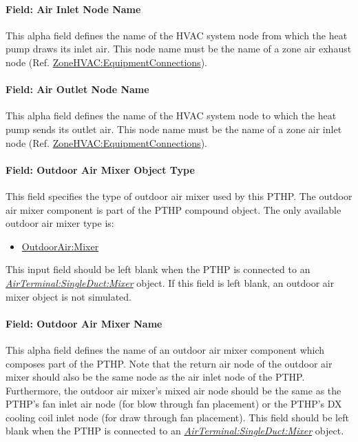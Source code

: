 \paragraph{Field: Air Inlet Node Name}\label{field-air-inlet-node-name-6-000}

This alpha field defines the name of the HVAC system node from which the heat pump draws its inlet air. This node name must be the name of a zone air exhaust node (Ref. \hyperref[zonehvacequipmentconnections]{ZoneHVAC:EquipmentConnections}).

\paragraph{Field: Air Outlet Node Name}\label{field-air-outlet-node-name-6-001}

This alpha field defines the name of the HVAC system node to which the heat pump sends its outlet air. This node name must be the name of a zone air inlet node (Ref. \hyperref[zonehvacequipmentconnections]{ZoneHVAC:EquipmentConnections}).

\paragraph{Field: Outdoor Air Mixer Object Type}\label{field-outdoor-air-mixer-object-type-3}

This field specifies the type of outdoor air mixer used by this PTHP. The outdoor air mixer component is part of the PTHP compound object. The only available outdoor air mixer type is:

\begin{itemize}
\tightlist
\item
  \hyperref[outdoorairmixer]{OutdoorAir:Mixer}
\end{itemize}

This input field should be left blank when the PTHP is connected to an \textit{\hyperref[airterminalsingleductmixer]{AirTerminal:SingleDuct:Mixer}} object. If this field is left blank, an outdoor air mixer object is not simulated.

\paragraph{Field: Outdoor Air Mixer Name}\label{field-outdoor-air-mixer-name-3}

This alpha field defines the name of an outdoor air mixer component which composes part of the PTHP. Note that the return air node of the outdoor air mixer should also be the same node as the air inlet node of the PTHP. Furthermore, the outdoor air mixer's mixed air node should be the same as the PTHP's fan inlet air node (for blow through fan placement) or the PTHP's DX cooling coil inlet node (for draw through fan placement). This field should be left blank when the PTHP is connected to an \textit{\hyperref[airterminalsingleductmixer]{AirTerminal:SingleDuct:Mixer}} object.

